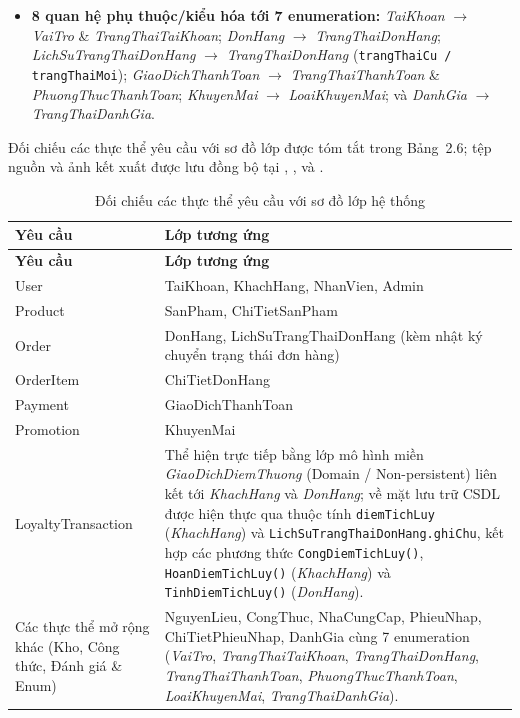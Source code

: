 \documentclass[12pt,a4paper]{report}
\begin{document}
\begin{sloppypar}
\begin{itemize}[leftmargin=*,nosep]
  \item \textbf{8 quan hệ phụ thuộc/kiểu hóa tới 7 enumeration:} \textit{TaiKhoan} $\rightarrow$ \textit{VaiTro} \& \textit{TrangThaiTaiKhoan}; \textit{DonHang} $\rightarrow$ \textit{TrangThaiDonHang}; \textit{LichSuTrangThaiDonHang} $\rightarrow$ \textit{TrangThaiDonHang} (\texttt{trangThaiCu / trangThaiMoi}); \textit{GiaoDichThanhToan} $\rightarrow$ \textit{TrangThaiThanhToan} \& \textit{PhuongThucThanhToan}; \textit{KhuyenMai} $\rightarrow$ \textit{LoaiKhuyenMai}; và \textit{DanhGia} $\rightarrow$ \textit{TrangThaiDanhGia}.
\end{itemize}
\end{sloppypar}
Đối chiếu các thực thể yêu cầu với sơ đồ lớp được tóm tắt trong Bảng~2.6; tệp nguồn và ảnh kết xuất được lưu đồng bộ tại , ,  và .

\begin{longtable}{>{\raggedright\arraybackslash}p{4.5cm}>{\raggedright\arraybackslash}p{10.7cm}}
\caption{Đối chiếu các thực thể yêu cầu với sơ đồ lớp hệ thống}\\
\hline
\rowcolor{gray!20} \textbf{Yêu cầu} & \textbf{Lớp tương ứng} \\
\hline
\endfirsthead
\hline
\rowcolor{gray!20} \textbf{Yêu cầu} & \textbf{Lớp tương ứng} \\
\hline
\endhead
User & TaiKhoan, KhachHang, NhanVien, Admin \\
\hline
Product & SanPham, ChiTietSanPham \\
\hline
Order & DonHang, LichSuTrangThaiDonHang (kèm nhật ký chuyển trạng thái đơn hàng) \\
\hline
OrderItem & ChiTietDonHang \\
\hline
Payment & GiaoDichThanhToan \\
\hline
Promotion & KhuyenMai \\
\hline
LoyaltyTransaction & Thể hiện trực tiếp bằng lớp mô hình miền \textit{GiaoDichDiemThuong} (\guillemotleft{}Domain / Non-persistent\guillemotright{}) liên kết tới \textit{KhachHang} và \textit{DonHang}; về mặt lưu trữ CSDL được hiện thực qua thuộc tính \texttt{diemTichLuy} (\textit{KhachHang}) và \texttt{LichSuTrangThaiDonHang.ghiChu}, kết hợp các phương thức \texttt{CongDiemTichLuy()}, \texttt{HoanDiemTichLuy()} (\textit{KhachHang}) và \texttt{TinhDiemTichLuy()} (\textit{DonHang}). \\
\hline
Các thực thể mở rộng khác (Kho, Công thức, Đánh giá \& Enum) & NguyenLieu, CongThuc, NhaCungCap, PhieuNhap, ChiTietPhieuNhap, DanhGia cùng 7 enumeration (\textit{VaiTro}, \textit{TrangThaiTaiKhoan}, \textit{TrangThaiDonHang}, \textit{TrangThaiThanhToan}, \textit{PhuongThucThanhToan}, \textit{LoaiKhuyenMai}, \textit{TrangThaiDanhGia}). \\
\hline
\end{longtable}
\end{document}
